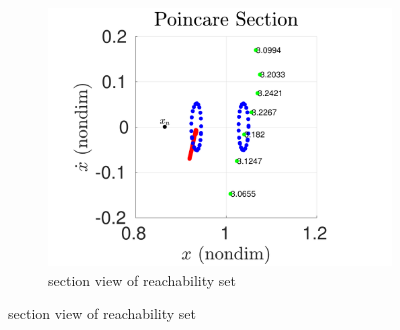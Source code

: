 \begin{figure}
\begin{subfigure}[htbp]{0.5\textwidth}
            \includegraphics[width=\textwidth]{figures/2017_JAS/poincare_compare} 
                \caption{\Poincare section view of reachability set} \label{fig:poincare_compare} 
        \end{subfigure} %
                

\end{figure}
